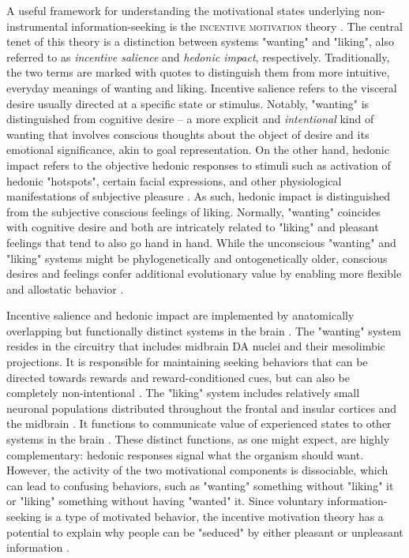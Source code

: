 A useful framework for understanding the motivational states underlying non-instrumental information-seeking is the \textsc{incentive motivation} theory \parencite{berridge_wanting_2009,robinson_roles_2016}. The central tenet of this theory is a distinction between systems "wanting" and "liking", also referred to as \emph{incentive salience} and \emph{hedonic impact}, respectively. Traditionally, the two terms are marked with quotes to distinguish them from more intuitive, everyday meanings of wanting and liking. Incentive salience refers to the visceral desire usually directed at a specific state or stimulus.  Notably, "wanting" is distinguished from cognitive desire -- a more explicit and \emph{intentional} kind of wanting that involves conscious thoughts about the object of desire and its emotional significance, akin to goal representation. On the other hand, hedonic impact refers to the objective hedonic responses to stimuli such as activation of hedonic "hotspots", certain facial expressions, and other physiological manifestations of subjective pleasure \parencite{berridge_pleasure_2015}. As such, hedonic impact is distinguished from the subjective conscious feelings of liking. Normally, "wanting" coincides with cognitive desire and both are intricately related to "liking" and pleasant feelings that tend to also go hand in hand. While the unconscious "wanting" and "liking" systems might be phylogenetically and ontogenetically older, conscious desires and feelings confer additional evolutionary value by enabling more flexible and allostatic behavior \parencite{damasio_nature_2013}.

Incentive salience and hedonic impact are implemented by anatomically overlapping but functionally distinct systems in the brain \parencite{berridge_dissecting_2009}. The "wanting" system resides in the circuitry that includes midbrain DA nuclei and their mesolimbic projections. It is responsible for maintaining seeking behaviors that can be directed towards rewards and reward-conditioned cues, but can also be completely non-intentional \parencite{berridge_wanting_2009}. The "liking" system includes relatively small neuronal populations distributed throughout the frontal and insular cortices and the midbrain \parencite{berridge_pleasure_2015}. It functions to communicate value of experienced states to other systems in the brain \parencite{damasio_nature_2013}. These distinct functions, as one might expect, are highly complementary: hedonic responses signal what the organism should want. However, the activity of the two motivational components is dissociable, which can lead to confusing behaviors, such as "wanting" something without "liking" it or "liking" something without having "wanted" it. Since voluntary information-seeking is a type of motivated behavior, the incentive motivation theory has a potential to explain why people can be "seduced" by either pleasant or unpleasant information \parencite{fitzgibbon_seductive_2020}.


